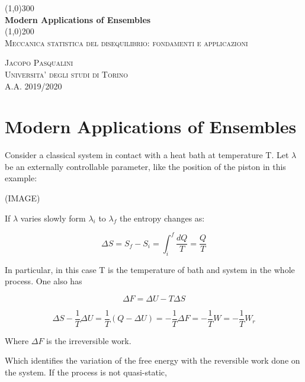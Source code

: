 \documentclass{article}
\begin{document}
\begin{titlepage}
	\begin{center}
	
	\line(1,0){300}\\
	[5mm]
	\huge{\bfseries Modern Applications of Ensembles}\\
	[2mm]
	\line(1,0){200}\\
	[2cm]
	\textsc{\Large Meccanica statistica del disequilibrio: fondamenti e applicazioni} \\
	[8cm]
	
	\end{center}
	
	\begin{flushright}
	\textsc{\LARGE Jacopo Pasqualini}\\
	[0.5cm]
	\textsc{\large Universita' degli studi di Torino\\
	[0.5cm]
	A.A. 2019/2020 }
	\end{flushright}
	
\end{titlepage}

\section{Modern Applications of Ensembles}\label{sec:langapp}

Consider a classical system in contact with a heat bath at temperature T. Let $\lambda$ be an externally controllable parameter, like the position of the piston in this example:

(IMAGE)

If $\lambda$ varies slowly form $\lambda_i$ to $\lambda_f$ the entropy changes as:

\begin{equation}
\Delta S = S_f - S_i = \int_{i}^{f} \frac{dQ}{T} = \frac{Q}{T}
\end{equation}

In particular, in this case T is the temperature of bath and system in the whole process. One also has

\begin{equation}
\Delta F = \Delta U - T \Delta S
\end{equation}

 $$ \Delta S - \frac{1}{T} \Delta U = \frac{1}{T}(Q - \Delta U) = -  \frac{1}{T} \Delta F = - \frac{1}{T} W =  - \frac{1}{T} W_r $$

Where $\Delta F$ is the irreversible work.

Which identifies the variation of the free energy with the reversible work done on the system. If the process is not quasi-static, 
\end{document}
